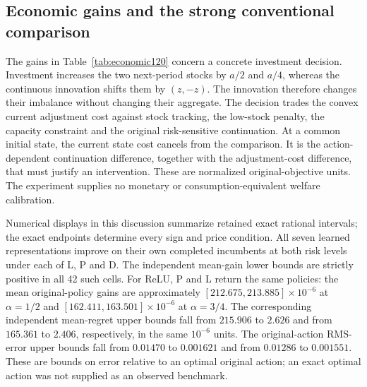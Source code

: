\subsection{Economic gains and the strong conventional comparison}
\label{sec:economicinterpretation120}

The gains in Table~\ref{tab:economic120} concern a concrete investment
decision. Investment increases the two next-period stocks by $a/2$ and $a/4$,
whereas the continuous innovation shifts them by $(z,-z)$. The innovation
therefore changes their imbalance without changing their aggregate. The
decision trades the convex current adjustment cost against stock tracking,
the low-stock penalty, the capacity constraint and the original risk-sensitive
continuation. At a common initial state, the current state cost cancels from
the comparison. It is the action-dependent continuation difference, together
with the adjustment-cost difference, that must justify an intervention.
These are normalized original-objective units. The experiment supplies no
monetary or consumption-equivalent welfare calibration.

Numerical displays in this discussion summarize retained exact rational
intervals; the exact endpoints determine every sign and price condition.
All seven learned representations improve on their own completed incumbents
at both risk levels under each of L, P and D. The independent mean-gain lower
bounds are strictly positive in all 42 such cells. For ReLU, P and L return
the same policies: the mean original-policy gains are approximately
$[212.675,213.885]\times10^{-6}$ at $\alpha=1/2$ and
$[162.411,163.501]\times10^{-6}$ at $\alpha=3/4$.
The corresponding independent mean-regret upper bounds fall from
$215.906$ to $2.626$ and from $165.361$ to $2.406$, respectively, in the
same $10^{-6}$ units. The original-action RMS-error upper bounds fall from
$0.01470$ to $0.001621$ and from $0.01286$ to $0.001551$.
These are bounds on error relative to an optimal original action; an exact
optimal action was not supplied as an observed benchmark.

